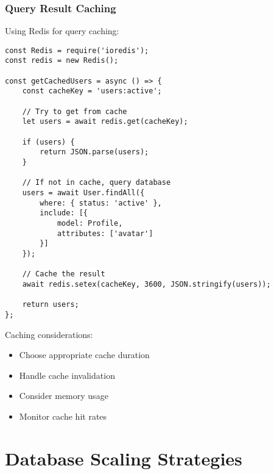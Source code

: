 \documentclass[12pt,a4paper]{book}
\begin{document}
	\subsubsection{Query Result Caching}
	\begin{tcolorbox}[title=Implementing Caching]
		Using Redis for query caching:
		
		\begin{verbatim}
const Redis = require('ioredis');
const redis = new Redis();

const getCachedUsers = async () => {
	const cacheKey = 'users:active';
	
	// Try to get from cache
	let users = await redis.get(cacheKey);
	
	if (users) {
		return JSON.parse(users);
	}
	
	// If not in cache, query database
	users = await User.findAll({
		where: { status: 'active' },
		include: [{
			model: Profile,
			attributes: ['avatar']
		}]
	});
	
	// Cache the result
	await redis.setex(cacheKey, 3600, JSON.stringify(users));
	
	return users;
};
		\end{verbatim}
		
		Caching considerations:
		\begin{itemize}
			\item Choose appropriate cache duration
			\item Handle cache invalidation
			\item Consider memory usage
			\item Monitor cache hit rates
		\end{itemize}
	\end{tcolorbox}
	
	\section{Database Scaling Strategies}
	
\end{document}
